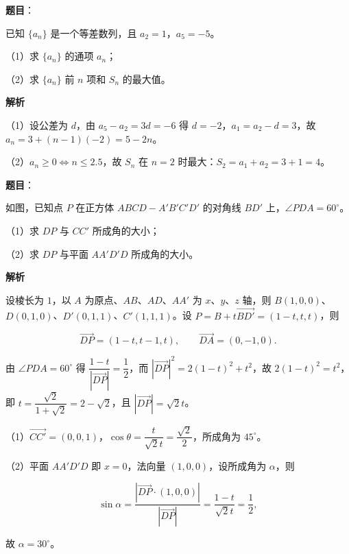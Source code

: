 \begin{answer}

\textbf{题目}：

已知 $\{a_n\}$ 是一个等差数列，且 $a_2=1$，$a_5=-5$。

（1）求 $\{a_n\}$ 的通项 $a_n$；

（2）求 $\{a_n\}$ 前 $n$ 项和 $S_n$ 的最大值。

\textbf{解析}

（1）设公差为 $d$，由 $a_5-a_2=3d=-6$ 得 $d=-2$，$a_1=a_2-d=3$，故 $a_n=3+(n-1)(-2)=5-2n$。

（2）$a_n\geqslant0\iff n\leqslant2.5$，故 $S_n$ 在 $n=2$ 时最大：$S_2=a_1+a_2=3+1=4$。


\end{answer}
\begin{answer}

\textbf{题目}：

如图，已知点 $P$ 在正方体 $ABCD-A'B'C'D'$ 的对角线 $BD'$ 上，$\angle PDA=60^\circ$。

（1）求 $DP$ 与 $CC'$ 所成角的大小；

（2）求 $DP$ 与平面 $AA'D'D$ 所成角的大小。
\nopagebreak[4]
\begin{center}\end{center}
\nopagebreak[4]
\textbf{解析}

设棱长为 $1$，以 $A$ 为原点、$AB$、$AD$、$AA'$ 为 $x$、$y$、$z$ 轴，则 $B(1,0,0)$、$D(0,1,0)$、$D'(0,1,1)$、$C'(1,1,1)$。设 $P=B+t\overrightarrow{BD'}=(1-t,t,t)$，则

\nopagebreak[4]
\[\overrightarrow{DP}=(1-t,t-1,t),\qquad \overrightarrow{DA}=(0,-1,0).\]

由 $\angle PDA=60^\circ$ 得 $\dfrac{1-t}{\left|\overrightarrow{DP}\right|}=\dfrac12$，而 $\left|\overrightarrow{DP}\right|^2=2(1-t)^2+t^2$，故 $2(1-t)^2=t^2$，即 $t=\dfrac{\sqrt2}{1+\sqrt2}=2-\sqrt2$，且 $\left|\overrightarrow{DP}\right|=\sqrt2t$。

（1）$\overrightarrow{CC'}=(0,0,1)$，$\cos\theta=\dfrac{t}{\sqrt2t}=\dfrac{\sqrt2}2$，所成角为 $45^\circ$。

（2）平面 $AA'D'D$ 即 $x=0$，法向量 $(1,0,0)$，设所成角为 $\alpha$，则

\nopagebreak[4]
\[\sin\alpha=\frac{\left|\overrightarrow{DP}\cdot(1,0,0)\right|}{\left|\overrightarrow{DP}\right|}=\frac{1-t}{\sqrt2t}=\frac12,\]

故 $\alpha=30^\circ$。


\end{answer}
